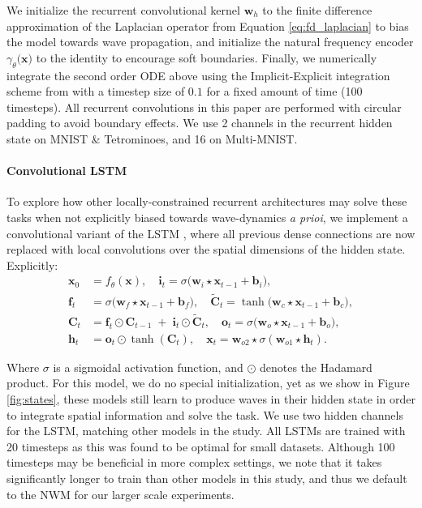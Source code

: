 We initialize the recurrent convolutional kernel $\mathbf{w}_h$ to the finite difference approximation of the Laplacian operator from Equation \ref{eq:fd_laplacian} to bias the model towards wave propagation, and initialize the natural frequency encoder $\gamma_{\theta}(\mathbf{x)}$ to the identity to encourage soft boundaries. Finally, we numerically integrate the second order ODE above using the Implicit-Explicit integration scheme from \citep{cornn} with a timestep size of $0.1$ for a fixed amount of time (100 timesteps). All recurrent convolutions in this paper are performed with circular padding to avoid boundary effects. We use 2 channels in the recurrent hidden state on MNIST \& Tetrominoes, and 16 on Multi-MNIST.

\paragraph{Convolutional LSTM} To explore how other locally-constrained recurrent architectures may solve these tasks when not explicitly biased towards wave-dynamics \emph{a prioi}, we implement a convolutional variant of the LSTM \citep{lstm}, where all previous dense connections are now replaced with local convolutions over the spatial dimensions of the hidden state. Explicitly:
\begin{align}
\mathbf{x}_0 &= f_{\theta}(\mathbf{x}), \quad
\mathbf{i}_t = \sigma\!\bigl(\mathbf{w}_{i} \star \mathbf{x}_{t-1} + \mathbf{b}_i\bigr), \\
\mathbf{f}_t &= \sigma\!\bigl(\mathbf{w}_{f} \star \mathbf{x}_{t-1} + \mathbf{b}_f\bigr), \quad 
\tilde{\mathbf{C}}_t = \tanh\!\bigl(\mathbf{w}_{c} \star \mathbf{x}_{t-1} + \mathbf{b}_c\bigr),\\
\mathbf{C}_t &= \mathbf{f}_t \odot \mathbf{C}_{t-1} \;+\; \mathbf{i}_t \odot \tilde{\mathbf{C}}_t, \quad
\mathbf{o}_t = \sigma\!\bigl(\mathbf{w}_{o} \star \mathbf{x}_{t-1} + \mathbf{b}_o\bigr), \\
\mathbf{h}_t &= \mathbf{o}_t \odot \tanh(\mathbf{C}_t), \quad
\mathbf{x}_t = \mathbf{w}_{o2} \star \sigma(\mathbf{w}_{o1} \star \mathbf{h}_t).
\end{align}

Where $\sigma$ is a sigmoidal activation function, and $\odot$ denotes the Hadamard product. For this model, we do no special initialization, yet as we show in Figure \ref{fig:states}, these models still learn to produce waves in their hidden state in order to integrate spatial information and solve the  task. We use two hidden channels for the LSTM, matching other models in the study. All LSTMs are trained with 20 timesteps as this was found to be optimal for small datasets. Although 100 timesteps may be beneficial in more complex settings, we note that it takes significantly longer to train than other models in this study, and thus we default to the NWM for our larger scale experiments.

